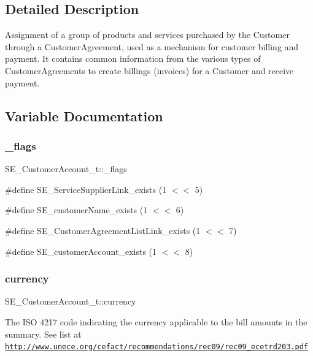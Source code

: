 \subsection{Detailed Description}
Assignment of a group of products and services purchased by the Customer through a Customer\+Agreement, used as a mechanism for customer billing and payment. It contains common information from the various types of Customer\+Agreements to create billings (invoices) for a Customer and receive payment. 

\subsection{Variable Documentation}
\mbox{\label{group__CustomerAccount_ga67357b4c7d720b91d84e22a2d383b840}} 
\subsubsection{\texorpdfstring{\+\_\+flags}{\_flags}}
{\footnotesize\ttfamily S\+E\+\_\+\+Customer\+Account\+\_\+t\+::\+\_\+flags}

\#define S\+E\+\_\+\+Service\+Supplier\+Link\+\_\+exists (1 $<$$<$ 5)

\#define S\+E\+\_\+customer\+Name\+\_\+exists (1 $<$$<$ 6)

\#define S\+E\+\_\+\+Customer\+Agreement\+List\+Link\+\_\+exists (1 $<$$<$ 7)

\#define S\+E\+\_\+customer\+Account\+\_\+exists (1 $<$$<$ 8) \mbox{\label{group__CustomerAccount_ga57aff523528ef264d27004ae1bff0377}} 
\subsubsection{\texorpdfstring{currency}{currency}}
{\footnotesize\ttfamily S\+E\+\_\+\+Customer\+Account\+\_\+t\+::currency}

The I\+SO 4217 code indicating the currency applicable to the bill amounts in the summary. See list at \href{http://www.unece.org/cefact/recommendations/rec09/rec09_ecetrd203.pdf}{\tt http\+://www.\+unece.\+org/cefact/recommendations/rec09/rec09\+\_\+ecetrd203.\+pdf} \mbox{\label{group__CustomerAccount_gade9da1bd7f943a99c644c927b0a25318}} 
